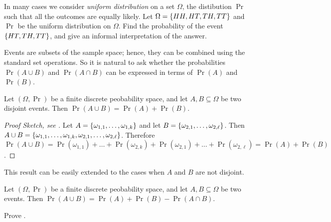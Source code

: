 \begin{exercise}
  In many cases we consider \emph{uniform distribution} on a set $\Omega$, the
  distibution $\Pr$ such that all the outcomes are equally likely.
  Let $\Omega = \set{HH, HT, TH, TT}$ and $\Pr$ be the uniform distribution on
  $\Omega$. Find the probability of the event $\set{HT, TH, TT}$, and give an
  informal interpretation of the answer.
\end{exercise}

Events are subsets of the sample space; hence, they can be combined using the
standard set operations. So it is natural to ask whether the probabilities
$\Pr(A \cup B)$ and $\Pr(A \cap B)$ can be expressed in terms of $\Pr(A)$ and
$\Pr(B)$.

\begin{theorem}
  Let $(\Omega, \Pr)$ be a finite discrete peobability space, and let $A, B
  \subseteq \Omega$ be two disjoint events. Then 
  $\Pr(A \cup B) = \Pr(A) + \Pr(B)$.
\end{theorem}
\begin{proof}[Proof Sketch, see ]
  Let $A = \set{\omega_{1, 1}, \dots, \omega_{1, k}}$ and 
  let $B = \set{\omega_{2, 1}, \dots, \omega_{2, \ell}}$. 
  Then $A \cup B = \set{\omega_{1, 1}, \dots, \omega_{1, k}, 
    \omega_{2, 1}, \dots, \omega_{2, \ell}}$.
  Therefore $\Pr(A \cup B) = 
    \Pr(\omega_{1, 1}) + \dots + \Pr(\omega_{2, k}) +
    \Pr(\omega_{2, 1}) + \dots + \Pr(\omega_{2, \ell}) = \Pr(A) + \Pr(B)$.
\end{proof}

This result can be easily extended to the cases when $A$ and $B$ are not
disjoint.
\begin{corollary}
\label{corollary:inclusion-exclustion-probability}
  Let $(\Omega, \Pr)$ be a finite discrete peobability space, and let $A, B
  \subseteq \Omega$ be two events. Then 
  $\Pr(A \cup B) = \Pr(A) + \Pr(B) - \Pr(A \cap B)$.
\end{corollary}

\begin{chapterendexercises}
  \exercise Prove .
\end{chapterendexercises}
